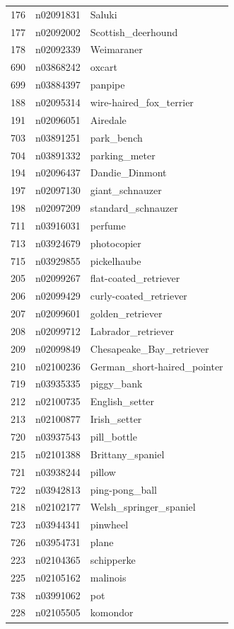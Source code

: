 \begin{table}
\begin{tabular}{cll}
176 & n02091831 & Saluki \\
177 & n02092002 & Scottish_deerhound \\
178 & n02092339 & Weimaraner \\
690 & n03868242 & oxcart \\
699 & n03884397 & panpipe \\
188 & n02095314 & wire-haired_fox_terrier \\
191 & n02096051 & Airedale \\
703 & n03891251 & park_bench \\
704 & n03891332 & parking_meter \\
194 & n02096437 & Dandie_Dinmont \\
197 & n02097130 & giant_schnauzer \\
198 & n02097209 & standard_schnauzer \\
711 & n03916031 & perfume \\
713 & n03924679 & photocopier \\
715 & n03929855 & pickelhaube \\
205 & n02099267 & flat-coated_retriever \\
206 & n02099429 & curly-coated_retriever \\
207 & n02099601 & golden_retriever \\
208 & n02099712 & Labrador_retriever \\
209 & n02099849 & Chesapeake_Bay_retriever \\
210 & n02100236 & German_short-haired_pointer \\
719 & n03935335 & piggy_bank \\
212 & n02100735 & English_setter \\
213 & n02100877 & Irish_setter \\
720 & n03937543 & pill_bottle \\
215 & n02101388 & Brittany_spaniel \\
721 & n03938244 & pillow \\
722 & n03942813 & ping-pong_ball \\
218 & n02102177 & Welsh_springer_spaniel \\
723 & n03944341 & pinwheel \\
726 & n03954731 & plane \\
223 & n02104365 & schipperke \\
225 & n02105162 & malinois \\
738 & n03991062 & pot \\
228 & n02105505 & komondor \\

\end{tabular}
\end{table}
